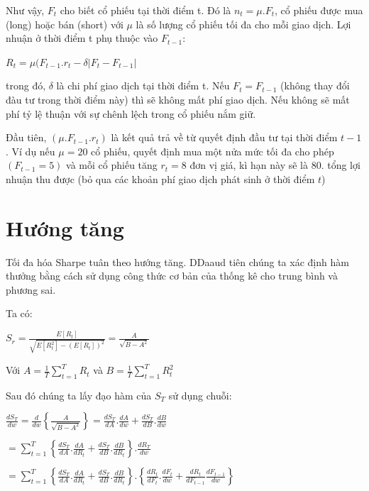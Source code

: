 \documentclass[14pt]{extreport}
\begin{document}
Như vậy, $F_t$ cho biết cổ phiếu tại thời điểm t. Đó là $n_t= \mu .F_t$, cổ phiếu được mua (long) hoặc bán (short) với $\mu$ là số lượng cổ phiếu tối đa cho mỗi giao dịch. Lợi nhuận ở thời điểm t phụ thuộc vào $F_{t-1}$:

\begin{center}
$R_t= \mu (F_{t-1}.r_t- \delta |F_t-F_{t-1}|$
\end{center}

trong đó, $\delta$ là chi phí giao dịch tại thời điểm t. Nếu $F_t=F_{t-1}$ (không thay đổi đàu tư trong thời điểm này) thì sẽ không mất phí giao dịch. Nếu không sẽ mất phí tỷ lệ thuận với sự chênh lệch trong cổ phiếu nắm giữ.

Đầu tiên, $(\mu . F_{t-1} .r_t)$ là kết quả trả về từ quyết định đầu tư tại thời điểm $t-1$. Ví dụ nếu $\mu=20$ cổ phiếu, quyết định mua một nửa mức tối đa cho phép $(F_{t-1}=5)$ và mỗi cổ phiếu tăng $r_t=8$ đơn vị giá, kì hạn này sẽ là 80. tổng lợi nhuận thu được (bỏ qua các khoản phí giao dịch phát sinh ở thời điểm $t$)

\section{Hướng tăng}

Tối đa hóa Sharpe tuân theo hướng tăng. DDaaud tiên chúng ta xác định hàm thưởng bằng cách sử dụng công thức cơ bản của thống kê cho trung bình và phương sai.

Ta có:


\begin{center}
$S_r=\frac{E[R_t]}{\sqrt{E[R_t ^2]-(E[R_t])^2}} =\frac{A}{\sqrt{B-A^2}}$
\end{center}


Với $A=\frac{1}{T} \sum_{t=1}^{T}R_t$ và $B=\frac{1}{T} \sum_{t=1}^{T}R_t^2$


Sau đó chúng ta lấy đạo hàm của $S_T$ sử dụng chuỗi:
\begin{center}
$\frac{dS_T}{dw}=\frac{d}{dw}\left \{ \frac{A}{\sqrt{B-A^2}} \right \}=\frac{dS_T}{dA}.\frac{dA}{dw}+\frac{dS_T}{dB}.\frac{dB}{dw}$


$=\sum_{t=1}^{T} \left\{\frac{dS_T}{dA}.\frac{dA}{dR_t}+\frac{dS_T}{dB}.\frac{dB}{dR_t}\right\}.\frac{dR_T}{dw}$


$=\sum_{t=1}^{T} \left\{\frac{dS_T}{dA}.\frac{dA}{dR_t}+\frac{dS_T}{dB}.\frac{dB}{dR_t}\right\}. \left\{\frac{dR_t}{dF_t}.\frac{dF_t}{dw}+\frac{dR_t}{dF_{t-1}} \frac{dF_{t-1}}{dw}\right\}$
\end{center}
\end{document}
